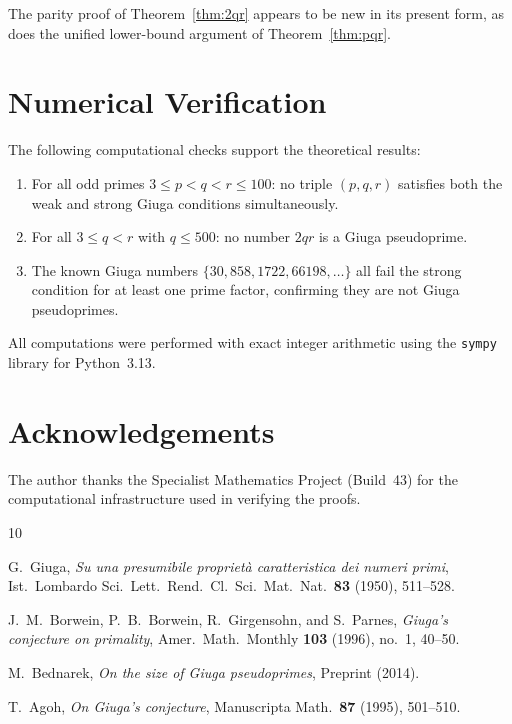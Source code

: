 \documentclass[12pt,a4paper]{amsart}
\theoremstyle{definition}
\begin{document}
The parity proof of Theorem~\ref{thm:2qr} appears to be new in its
present form, as does the unified lower-bound argument of Theorem~\ref{thm:pqr}.

\section{Numerical Verification}

The following computational checks support the theoretical results:

\begin{enumerate}
  \item For all odd primes $3 \le p < q < r \le 100$: no triple $(p, q, r)$
        satisfies both the weak and strong Giuga conditions simultaneously.
  \item For all $3 \le q < r$ with $q \le 500$: no number $2qr$ is a
        Giuga pseudoprime.
  \item The known Giuga numbers $\{30, 858, 1722, 66198, \ldots\}$ all fail
        the strong condition for at least one prime factor, confirming they are
        not Giuga pseudoprimes.
\end{enumerate}

All computations were performed with exact integer arithmetic using the
\texttt{sympy} library for Python~3.13.

\section*{Acknowledgements}

The author thanks the Specialist Mathematics Project (Build~43) for the
computational infrastructure used in verifying the proofs.

\begin{thebibliography}{10}

G.~Giuga,
\emph{Su una presumibile propriet\`a caratteristica dei numeri primi},
Ist.\ Lombardo Sci.\ Lett.\ Rend.\ Cl.\ Sci.\ Mat.\ Nat.\ \textbf{83}
(1950), 511--528.

J.~M.~Borwein, P.~B.~Borwein, R.~Girgensohn, and S.~Parnes,
\emph{Giuga's conjecture on primality},
Amer.\ Math.\ Monthly \textbf{103} (1996), no.\ 1, 40--50.

M.~Bednarek,
\emph{On the size of Giuga pseudoprimes},
Preprint (2014).

T.~Agoh,
\emph{On Giuga's conjecture},
Manuscripta Math.\ \textbf{87} (1995), 501--510.

\end{thebibliography}
\end{document}
